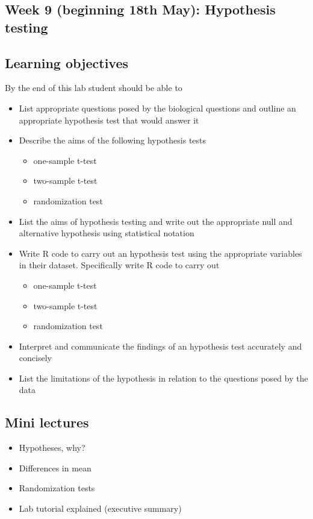 \documentclass{article}
\begin{document}
\newpage

\subsection*{Week 9 (beginning 18th May): Hypothesis testing}


\subsection*{Learning objectives}
By the end of this lab student should be able to
\begin{itemize}
\item List appropriate questions posed by the biological questions and  outline an appropriate hypothesis test that would answer it
\item Describe the aims of the following hypothesis tests
  \begin{itemize}
  \item one-sample t-test
  \item two-sample t-test
  \item randomization test
  \end{itemize}
\item List the aims of hypothesis testing and write out the appropriate null and alternative hypothesis using statistical notation
\item Write R code to carry out an hypothesis test using the appropriate variables in their dataset. Specifically write R code to carry out
  \begin{itemize}
  \item one-sample t-test
  \item two-sample t-test
  \item randomization test
  \end{itemize}
\item Interpret and communicate the findings of an hypothesis test accurately and concisely
\item List the limitations of the hypothesis in relation to the questions posed by the data
\end{itemize}

\subsection*{Mini lectures}

\begin{itemize}
\item Hypotheses, why?
\item Differences in mean
\item Randomization tests
\item Lab tutorial explained (executive summary)
\end{itemize}
\end{document}
